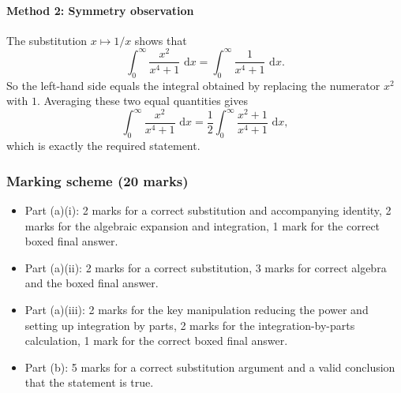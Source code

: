 \documentclass[12pt]{article}
\newcommand{\dd}{\,\mathrm{d}}
\begin{document}
\paragraph{Method 2: Symmetry observation}
The substitution \(x\mapsto 1/x\) shows that
\[
\int_{0}^{\infty} \frac{x^2}{x^4+1}\,\dd x
=\int_{0}^{\infty} \frac{1}{x^4+1}\,\dd x.
\]
So the left-hand side equals the integral obtained by replacing the numerator \(x^2\) with \(1\). Averaging these two equal quantities gives
\[
\int_{0}^{\infty} \frac{x^2}{x^4+1}\,\dd x
=\frac{1}{2}\int_{0}^{\infty} \frac{x^2+1}{x^4+1}\,\dd x,
\]
which is exactly the required statement.

\subsubsection{Marking scheme \hfill (20 marks)}
\begin{itemize}
  \item Part (a)(i): 2 marks for a correct substitution and accompanying identity, 2 marks for the algebraic expansion and integration, 1 mark for the correct boxed final answer.
  \item Part (a)(ii): 2 marks for a correct substitution, 3 marks for correct algebra and the boxed final answer.
  \item Part (a)(iii): 2 marks for the key manipulation reducing the power and setting up integration by parts, 2 marks for the integration-by-parts calculation, 1 mark for the correct boxed final answer.
  \item Part (b): 5 marks for a correct substitution argument and a valid conclusion that the statement is true.
\end{itemize}
\end{document}
